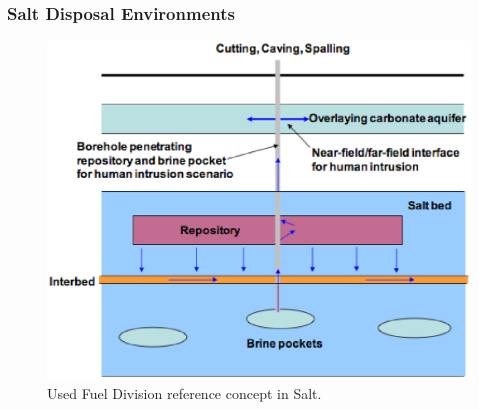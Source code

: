\begin{frame}[ctb!]
  \frametitle{Salt Disposal Environments}

  \begin{figure}[h!]
    \begin{center}
      \includegraphics[height=.7\textheight]{saltGPAM.eps}
    \end{center}
    \caption{Used Fuel Division reference concept in Salt.\cite{clayton_generic_2010}}
    \label{fig:saltGPAM}
  \end{figure}
\end{frame}

